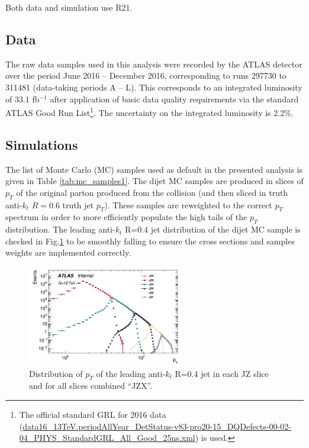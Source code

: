 Both data and simulation use R21.

\subsection{Data}

The raw data samples used in this analysis were recorded by the ATLAS detector over the period June 2016 -- December 2016, corresponding to runs 297730 to 311481 (data-taking periods A -- L). This corresponds to an integrated luminosity of 33.1 fb${}^{-1}$ after application of basic data quality requirements via the standard ATLAS Good Run List\footnote{The official standard GRL for 2016 data (\url{data16_13TeV.periodAllYear_DetStatus-v83-pro20-15_DQDefects-00-02-04_PHYS_StandardGRL_All_Good_25ns.xml}) is used.}. The uncertainty on the integrated luminosity is 2.2\%. 

\subsection{Simulations}

The list of Monte Carlo (MC) samples used as default in the presented analysis is given in Table \ref{tab:mc_samples1}. The dijet MC samples are produced in slices of $p_{T}$ of the original parton produced from the collision (and then sliced in truth anti-$k_t$ $R=0.6$ truth jet $p_T$).  These samples are reweighted to the correct $p_{T}$ spectrum in order to more efficiently populate the high tails of the $p_{T}$ distribution. The leading anti-$k_t$ R=0.4 jet distribution of the dijet MC sample is checked in Fig.\ref{fig:gbb-leadAkt4} to be smoothly falling to ensure the cross sections and samples weights are implemented correctly.

\begin{figure}[htbp]
  \centering
 \includegraphics[width=0.6\textwidth]{figures/gbb/LeadJetCheck.png}
\caption{Distribution of $p_T$ of the leading anti-$k_t$ R=0.4 jet in each JZ slice and for all slices combined ``JZX''.}
  \label{fig:gbb-leadAkt4}
\end{figure}


